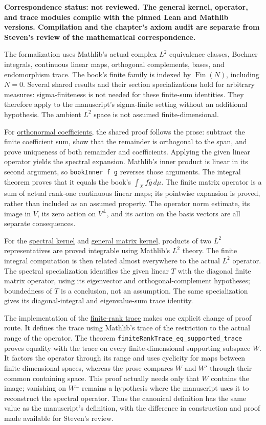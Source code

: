 \textbf{Correspondence status: not reviewed. The general kernel, operator, and trace modules compile with the pinned Lean and Mathlib versions. Compilation and the chapter's axiom audit are separate from Steven's review of the mathematical correspondence.}

The formalization uses Mathlib's actual complex $L^2$ equivalence classes, Bochner integrals, continuous linear maps, orthogonal complements, bases, and endomorphism trace. The book's finite family is indexed by $\operatorname{Fin}(N)$, including $N=0$. Several shared results and their section specializations hold for arbitrary measures: sigma-finiteness is not needed for these finite-sum identities. They therefore apply to the manuscript's sigma-finite setting without an additional hypothesis. The ambient $L^2$ space is not assumed finite-dimensional.

For \hyperref[finite-orthonormal-coefficients]{orthonormal coefficients}, the shared proof follows the prose: subtract the finite coefficient sum, show that the remainder is orthogonal to the span, and prove uniqueness of both remainder and coefficients. Applying the given linear operator yields the spectral expansion. Mathlib's inner product is linear in its second argument, so \texttt{bookInner f g} reverses those arguments. The integral theorem proves that it equals the book's $\int_X f\overline g\,d\mu$. The finite matrix operator is a sum of actual rank-one continuous linear maps; its pointwise expansion is proved, rather than included as an assumed property. The operator norm estimate, its image in $V$, its zero action on $V^\perp$, and its action on the basis vectors are all separate consequences.

For the \hyperref[finite-spectral-kernel]{spectral kernel} and \hyperref[finite-kernel-operator]{general matrix kernel}, products of two $L^2$ representatives are proved integrable using Mathlib's $L^2$ theory. The finite integral computation is then related almost everywhere to the actual $L^2$ operator. The spectral specialization identifies the given linear $T$ with the diagonal finite matrix operator, using its eigenvector and orthogonal-complement hypotheses; boundedness of $T$ is a conclusion, not an assumption. The same specialization gives its diagonal-integral and eigenvalue-sum trace identity.

The implementation of the \hyperref[finite-kernel-trace-definition]{finite-rank trace} makes one explicit change of proof route. It defines the trace using Mathlib's trace of the restriction to the actual range of the operator. The theorem \texttt{finiteRankTrace\_eq\_supported\_trace} proves equality with the trace on every finite-dimensional supporting subspace $W$. It factors the operator through its range and uses cyclicity for maps between finite-dimensional spaces, whereas the prose compares $W$ and $W'$ through their common containing space. This proof actually needs only that $W$ contains the image; vanishing on $W^\perp$ remains a hypothesis where the manuscript uses it to reconstruct the spectral operator. Thus the canonical definition has the same value as the manuscript's definition, with the difference in construction and proof made available for Steven's review.

